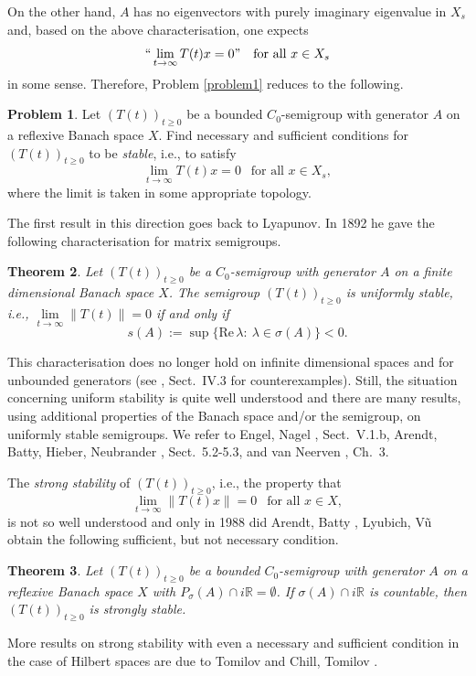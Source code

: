 \documentclass[11pt,intlimits, draft,oneside]{amsart}
\newtheorem{thm}{Theorem}[section]
\theoremstyle{definition}
\newtheorem{problem}[thm]{Problem}
\renewcommand{\Re}{\mathrm{Re}\,}
\def\RR{\mathbb{R}}
\begin{document}
On the other hand, $A$ has no eigenvectors with purely imaginary
eigenvalue in $X_s$  and, based on the above characterisation, one
expects 
\begin{equation*}
``\lim_{t\to\infty}T(t)x=0"   \ \ \text{ for all } x\in X_s
\end{equation*}
in some sense. Therefore, Problem \ref{problem1} reduces to the
following.
%
\begin{problem}\label{problem2}
Let $(T(t))_{t\geq 0}$ be a bounded $C_0$-semigroup with generator
$A$ on a reflexive Banach space $X$. Find necessary and sufficient
conditions for $(T(t))_{t\geq 0}$ to be \emph{stable}, i.e., to
satisfy
\begin{equation*}
\lim_{t\to\infty}T(t)x=0 \ \ \text{ for all } x\in X_s,
\end{equation*}
where the limit is taken in some appropriate topology.
\end{problem}
%

The first result in this direction goes back to Lyapunov.
In 1892 he gave the following characterisation for matrix semigroups.
%
\begin{thm}
Let $(T(t))_{t\geq 0}$ be a $C_0$-semigroup with generator $A$ on a
finite dimensional Banach space $X$. The semigroup $(T(t))_{t\geq
0}$ is uniformly stable, i.e., $\lim\limits_{t\to\infty}\| T(t)\|
=0$ if and only if
\begin{equation*}
s(A):=\sup\big\{\Re \lambda:\ \lambda \in\sigma(A)\bigr\}<0.
\end{equation*}
\end{thm}
%
This characterisation does no longer hold on infinite dimensional
spaces and for  unbounded generators (see \cite{engel/nagel:2000},
Sect.~IV.3 for counterexamples). Still, the situation concerning uniform stability is quite well
understood and there are many results, using additional properties
of the Banach space and/or the semigroup, on uniformly stable
semigroups.  We refer to Engel, Nagel \cite{engel/nagel:2000}, Sect.~V.1.b, Arendt, Batty, Hieber, Neubrander \cite{arendt/etal:2001}, Sect.~5.2-5.3, and van Neerven \cite{vanneerven:1996}, Ch.~3. 

The \emph{strong stability} of $(T(t))_{t\geq 0}$, i.e., the
property that
\begin{equation*}
\lim_{t\to\infty}\| T(t)x \| =0 \ \ \text{ for all } x\in X,
\end{equation*}
is not so well understood and only in 1988 did Arendt, Batty
\cite{arendt/batty:1988}, Lyubich, V\~u \cite{lyubich/vu:1988}
obtain the following sufficient, but not necessary condition.
%
\begin{thm}
Let $(T(t))_{t\geq 0}$ be a bounded $C_0$-semigroup with generator
$A$ on a reflexive Banach space $X$ with $P_\sigma(A)\cap i\RR =\emptyset$. If $\sigma(A)\cap i\RR$ is
countable, then $(T(t))_{t\geq 0}$ is strongly stable.
\end{thm}
%
More results on strong stability with even a necessary and
sufficient condition in the case of Hilbert spaces are due to
Tomilov \cite{tomilov:2001} and Chill, Tomilov
\cite{chill/tomilov:2003, chill/tomilov:2004}.
\end{document}
